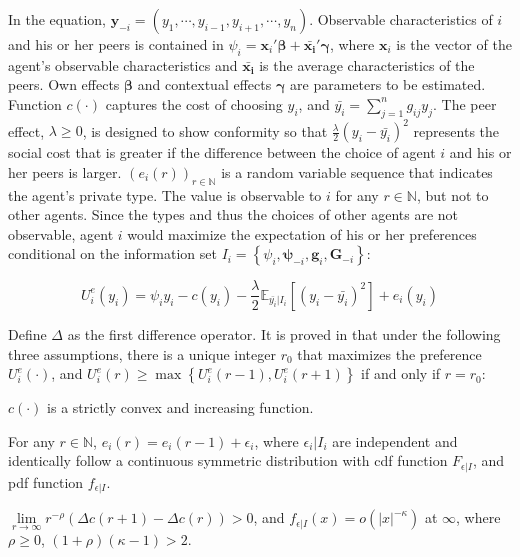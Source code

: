 In the equation, $\mathbf{y}_{-i}=\left(y_1,\cdots,y_{i-1},y_{i+1},\cdots,y_n\right)$. Observable characteristics of $i$ and his or her peers is contained in $\psi_i=\mathbf{x}_i\mathbf{'\beta}+\mathbf{\bar{x_i}'\gamma}$, where $\mathbf{x}_i$ is the vector of the agent's observable characteristics and $\mathbf{\bar{x_i}}$ is the average characteristics of the peers. Own effects $\mathbf{\beta}$ and contextual effects $\mathbf{\gamma}$ are parameters to be estimated. Function $c\left(\cdot\right)$ captures the cost of choosing $y_i$, and $\bar{y_i}=\sum_{j=1}^n g_{ij}y_j$. The peer effect, $\lambda \geq 0$, is designed to show conformity so that $\frac{\lambda}{2}\left(y_i-\bar{y_i}\right)^2$ represents the social cost that is greater if the difference between the choice of agent $i$ and his or her peers is larger. $\left(e_i\left(r\right)\right)_{r\in\mathbb{N}}$ is a random variable sequence that indicates the agent's private type. The value is observable to $i$ for any $r \in \mathbb{N}$, but not to other agents. Since the types and thus the choices of other agents are not observable, agent $i$ would maximize the expectation of his or her preferences conditional on the information set $I_i=\left\{ \psi_i, \mathbf{\psi}_{-i}, \mathbf{g}_i, \mathbf{G}_{-i} \right\}$:

\begin{equation}
    \nonumber
    U_i^e\left(y_i\right) = \psi_i y_i - c\left(y_i\right) - \frac{\lambda}{2} 
\mathbb{E}_{\bar{y_i}|I_i} \left[\left(y_i-\bar{y_i}\right)^2\right] + e_i\left(y_i\right)
\end{equation}

Define $\Delta$ as the first difference operator. It is proved in \cite{houndetoungan2022count} that under the following three assumptions, there is a unique integer $r_0$ that maximizes the preference $U_i^e\left(\cdot\right)$, and $U_i^e\left(r\right) \geq \max\left\{ 
U_i^e\left(r-1\right),U_i^e\left(r+1\right) \right\}$ if and only if $r=r_0$:

\begin{assumption}
  $c(\cdot)$ is a strictly convex and increasing function.
\end{assumption}
\begin{assumption}
  For any $r \in \mathbb{N}$, $e_i\left(r\right)=e_i\left(r-1\right)+\epsilon_i$, where $\epsilon_i|I_i$ are independent and identically follow a continuous symmetric distribution with cdf function $F_{\epsilon|I}$, and pdf function $f_{\epsilon|I}$.
\end{assumption}
\begin{assumption}
  $\lim\limits_{r \to \infty} r^{-\rho} \left( \Delta c(r+1) - \Delta c(r) \right)>0$, and $f_{\epsilon|I}(x)=o(|x|^{-\kappa})$ at $\infty$, where $\rho \geq 0$, $(1+\rho)(\kappa-1)>2$.
\end{assumption}

